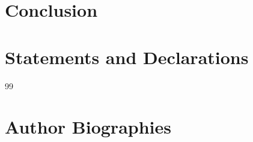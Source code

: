 \documentclass[10pt,a4paper]{article}
\begin{document}










\section{Conclusion}
\label{sec:conclusion}



\section*{Statements and Declarations}



%   
%   

\begin{thebibliography}{99}
\small





\end{thebibliography}

\section*{Author Biographies}

\leavevmode\par\vspace{-\baselineskip}%









\end{document}
